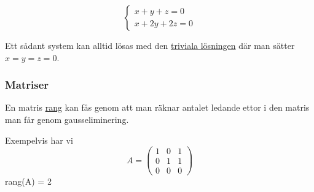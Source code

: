 \documentclass[../main.tex]{subfiles}
\begin{document}
$$
\begin{cases}
x + y + z = 0\\
x + 2y +2 z = 0
\end{cases}
$$

Ett sådant system kan alltid lösas med den \underline{triviala lösningen} där man sätter $x = y = z = 0$.

\subsubsection{Matriser}
\begin{definition}
\label{matrisrang}
En matris \underline{rang} kan fås genom att man räknar antalet ledande ettor i den matris man får genom gausseliminering.

Exempelvis har vi
$$A = \begin{pmatrix}
1 & 0 & 1\\
0 & 1 & 1\\
0 & 0 & 0
\end{pmatrix}$$
rang(A) = 2
\end{definition}
\end{document}
